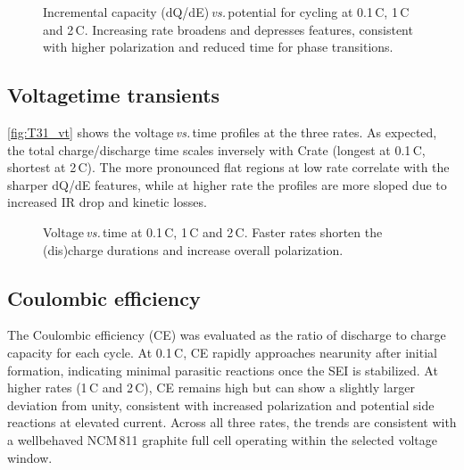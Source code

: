 \begin{figure}[h]
\centering

\caption{Incremental capacity (dQ/dE)\,\textit{vs.}\,potential for cycling at 0.1\,C, 1\,C and 2\,C. Increasing rate broadens and depresses features, consistent with higher polarization and reduced time for phase transitions.}
\label{fig:T31_dQdE}
\end{figure}

\subsection{Voltage\textendash time transients}
\autoref{fig:T31_vt} shows the voltage\,\textit{vs.}\,time profiles at the three rates. As expected, the total charge/discharge time scales inversely with C\textendash rate (longest at 0.1\,C, shortest at 2\,C). The more pronounced flat regions at low rate correlate with the sharper dQ/dE features, while at higher rate the profiles are more sloped due to increased IR drop and kinetic losses.

\begin{figure}[h]
\centering

\caption{Voltage\,\textit{vs.}\,time at 0.1\,C, 1\,C and 2\,C. Faster rates shorten the (dis)charge durations and increase overall polarization.}
\label{fig:T31_vt}
\end{figure}

\subsection{Coulombic efficiency}
The Coulombic efficiency (CE) was evaluated as the ratio of discharge to charge capacity for each cycle. At 0.1\,C, CE rapidly approaches near\textendash unity after initial formation, indicating minimal parasitic reactions once the SEI is stabilized. At higher rates (1\,C and 2\,C), CE remains high but can show a slightly larger deviation from unity, consistent with increased polarization and potential side reactions at elevated current. Across all three rates, the trends are consistent with a well\textendash behaved NCM\,811\,\textbar\,graphite full cell operating within the selected voltage window.
